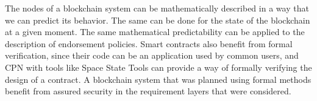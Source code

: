 \documentclass[sigconf, nonacm]{acmart}
\begin{document}
The nodes of a blockchain system can be mathematically described in a way that we can predict its behavior.
The same can be done for the state of the blockchain at a given moment. The same mathematical predictability
can be applied to the description of endorsement policies. Smart contracts also benefit from formal verification,
since their code can be an application used by common users, and CPN with tools like Space State Tools can provide
a way of formally verifying the design of a contract.
A blockchain system that was planned using formal methods benefit from assured security in the requirement layers
that were considered.



\end{document}
